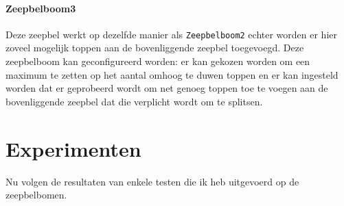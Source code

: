 \documentclass[12pt,hidelinks]{article}
\begin{document}
    \subsection{Zeepbelboom3}
    Deze zeepbel werkt op dezelfde manier als {\tt Zeepbelboom2} echter worden er hier
    zoveel mogelijk toppen aan de bovenliggende zeepbel toegevoegd. Deze zeepbelboom
    kan geconfigureerd worden: er kan gekozen worden om een maximum te zetten op het 
    aantal omhoog te duwen toppen en er kan ingesteld worden dat er geprobeerd wordt
    om net genoeg toppen toe te voegen aan de bovenliggende zeepbel dat die verplicht
    wordt om te splitsen.  
    \part{Experimenten}
    Nu volgen de resultaten van enkele testen die ik heb uitgevoerd op de zeepbelbomen.
\end{document}
